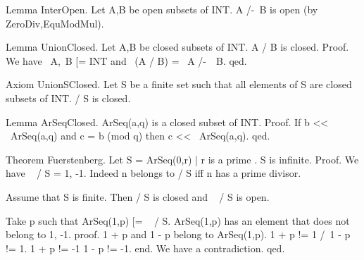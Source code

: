 Lemma InterOpen.    Let A,B be open subsets of INT.
                    A /-\ B is open (by ZeroDiv,EquModMul).

Lemma UnionClosed.  Let A,B be closed subsets of INT.
                    A \-/ B is closed.
Proof.
    We have ~A,~B [= INT and ~(A \-/ B) = ~A /-\ ~B.
qed.

Axiom UnionSClosed. Let S be a finite set such that
                        all elements of S are closed subsets of INT.
                    \-/ S is closed.

Lemma ArSeqClosed.  ArSeq(a,q) is a closed subset of INT.
Proof.
    If b << ~ArSeq(a,q) and c = b (mod q) then c << ~ArSeq(a,q).
qed.

Theorem Fuerstenberg.   Let S = { ArSeq(0,r) | r is a prime }.
                        S is infinite.
Proof.
    We have ~ \-/ S = {1, -1}.
    Indeed n belongs to \-/ S iff n has a prime divisor.

    Assume that S is finite.
    Then \-/ S is closed and ~ \-/ S is open.

    Take p such that ArSeq(1,p) [= ~ \-/ S.
    ArSeq(1,p) has an element that does not belong to {1, -1}.
    proof.
        1 + p and 1 - p belong to ArSeq(1,p).
        1 + p !=  1 /\ 1 - p !=  1.
        1 + p != -1 \/ 1 - p != -1.
    end.
    We have a contradiction.
qed.
